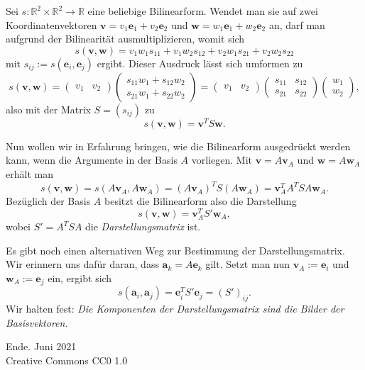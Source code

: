 \documentclass[9pt]{beamer}
\newcommand{\modest}[1]{{\small\color{gray}#1}}
\newcommand{\bv}[1]{\mathbf{#1}}
\newcommand{\R}{\mathbb R}
\begin{document}
\begin{frame}
Sei $s\colon\R^2\times\R^2\to\R$ eine beliebige Bilinearform. Wendet
man sie auf zwei Koordinatenvektoren $\bv v = v_1\bv e_1 + v_2\bv e_2$
und $\bv w = w_1\bv e_1+w_2\bv e_2$ an, darf man aufgrund der
Bilinearität ausmultiplizieren, womit sich
\[s(\bv v,\bv w) =
v_1 w_1 s_{11} + v_1 w_2 s_{12}
+ v_2 w_1 s_{21} + v_2 w_2 s_{22}\]
mit $s_{ij}:=s(\bv e_i,\bv e_j)$ ergibt.\pause{} Dieser Ausdruck lässt sich
umformen zu
\[s(\bv v,\bv w) = \begin{pmatrix}
v_1 & v_2
\end{pmatrix}\begin{pmatrix}
s_{11} w_1 + s_{12} w_2\\
s_{21} w_1 + s_{22} w_2
\end{pmatrix}
= \begin{pmatrix}v_1 & v_2\end{pmatrix}
\begin{pmatrix}s_{11} & s_{12}\\
s_{21} & s_{22}\end{pmatrix}
\begin{pmatrix}w_1\\ w_2 \end{pmatrix},\]
also mit der Matrix $S=(s_{ij})$ zu
\[s(\bv v,\bv w) = \bv v^T S\bv w.\]
\end{frame}

\begin{frame}
Nun wollen wir in Erfahrung bringen, wie die Bilinearform ausgedrückt
werden kann, wenn die Argumente in der Basis $A$ vorliegen.
Mit $\bv v = A\bv v_A$ und $\bv w = A\bv w_A$ erhält man
\[s(\bv v,\bv w) = s(A\bv v_A,A\bv w_A) = (A\bv v_A)^T S(A\bv w_A)
= \bv v_A^T A^T S A\bv w_A.\]\pause
Bezüglich der Basis $A$ besitzt die Bilinearform also die Darstellung
\[s(\bv v,\bv w) = \bv v_A^T S'\bv w_A,\]
wobei $S'=A^T SA$ die \emph{Darstellungsmatrix} ist.
\end{frame}

\begin{frame}
Es gibt noch einen alternativen Weg zur Bestimmung der Darstellungsmatrix.
Wir erinnern uns dafür daran, dass $\bv a_k = A\bv e_k$ gilt.
Setzt man nun $\bv v_A := \bv e_i$ und $\bv w_A := \bv e_j$ ein,
ergibt sich
\[s(\bv a_i,\bv a_j) = \bv e_i^T S'\bv e_j = (S')_{ij}.\]\pause
Wir halten fest:
\emph{Die Komponenten der Darstellungsmatrix sind die Bilder der
Basisvektoren.}
\end{frame}

\begin{frame}
Ende.
\vfill\hfill\modest{Juni 2021}\\
\hfill\modest{Creative Commons CC0 1.0}
\end{frame}
\end{document}
